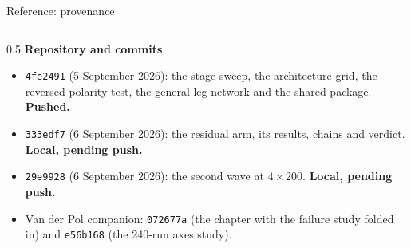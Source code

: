 \documentclass[aspectratio=169,10pt]{beamer}
\begin{document}
\begin{frame}[shrink=25]{Reference: provenance}
  \vspace{1mm}
  \begin{columns}[T]
    \begin{column}{0.5\textwidth}
      \textbf{Repository and commits}
      {\scriptsize
      \begin{itemize}
        \item \texttt{4fe2491} (5 September 2026): the stage sweep, the
              architecture grid, the reversed-polarity test, the general-leg
              network and the shared package. \textbf{Pushed.}
        \item \texttt{333edf7} (6 September 2026): the residual arm, its
              results, chains and verdict. \textbf{Local, pending push.}
        \item \texttt{29e9928} (6 September 2026): the second wave at
              $4\times200$. \textbf{Local, pending push.}
        \item Van der Pol companion: \texttt{072677a} (the chapter with the
              failure study folded in) and \texttt{e56b168} (the 240-run axes
              study).
      \end{itemize}}
      \vspace{1mm}


\end{column}
\end{columns}
\end{frame}
\end{document}
